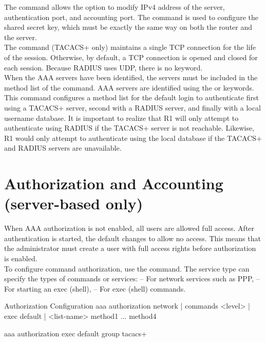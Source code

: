 The  command allows the option to modify IPv4 address of the server, authentication port, and accounting port. The  command is used to configure the shared secret key, which must be exactly the same way on both the router and the server.\\

The  command (TACACS+ only) maintains a single TCP connection for the life of the session. Otherwise, by default, a TCP connection is opened and closed for each session. Because RADIUS uses UDP, there is no  keyword.\\

When the AAA servers have been identified, the servers must be included in the method list of the  command. AAA servers are identified using the  or  keywords. This command configures a method list for the default login to authenticate first using a TACACS+ server, second with a RADIUS server, and finally with a local username database. It is important to realize that R1 will only attempt to authenticate using RADIUS if the TACACS+ server is not reachable. Likewise, R1 would only attempt to authenticate using the local database if the TACACS+ and RADIUS servers are unavailable.

\section{Authorization and Accounting (server-based only)}

When AAA authorization is not enabled, all users are allowed full access. After authentication is started, the default changes to allow no access. This means that the administrator must create a user with full access rights before authorization is enabled. \\

To configure command authorization, use the  command. The service type can specify the types of commands or services:
 -- For network services such as PPP,  -- For starting an exec (shell),  -- For exec (shell) commands. 

\begin{sexylisting}{Authorization Configuration}
aaa authorization {network | commands <level> | exec} {default | <list-name>} 
  method1 ... method4
  
aaa authorization exec default group tacacs+
\end{sexylisting}

